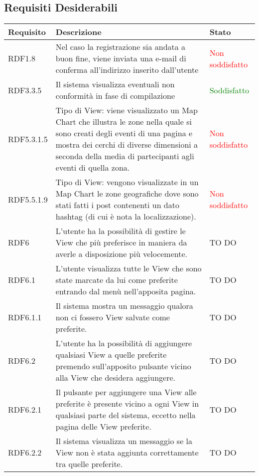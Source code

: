 \subsection{Requisiti Desiderabili}
\begin{center}

	\def\arraystretch{1.5}
	\bgroup
	\begin{longtable}{| p{2.5cm} | p{8cm} | p{3.5cm} |}
		\hline
		\textbf{Requisito} & \textbf{Descrizione} & \textbf{Stato} \\
		\hline
		RDF1.8  &  Nel caso la registrazione sia andata a buon fine, viene inviata una e-mail di conferma all'indirizzo inserito dall'utente  &  \textcolor{red}{ Non soddisfatto} \\
		\hline
		RDF3.3.5  &  Il sistema visualizza eventuali non conformità in fase di compilazione  &  \textcolor{green}{Soddisfatto} \\
		\hline
		RDF5.3.1.5  &  Tipo di View: viene visualizzato un Map Chart che illustra le zone nella quale si sono creati degli eventi di una pagina e mostra dei cerchi di diverse dimensioni a seconda della media di partecipanti agli eventi di quella zona. & \textcolor{red}{ Non soddisfatto} \\
		\hline
		RDF5.5.1.9  &  Tipo di View: vengono visualizzate in un Map Chart le zone geografiche dove sono stati fatti i post contenenti un dato hashtag (di cui è nota la localizzazione). & \textcolor{red}{ Non soddisfatto} \\
		\hline
		RDF6  & L'utente ha la possibilità di gestire le View che più preferisce in maniera da averle a disposizione più velocemente. &  TO DO \\
		\hline
		RDF6.1  & L'utente visualizza tutte le View che sono state marcate da lui come preferite entrando dal menù nell'apposita pagina. & TO DO \\
		\hline
		RDF6.1.1  & Il sistema mostra un messaggio qualora non ci fossero View salvate come preferite. &  TO DO \\
		\hline
		RDF6.2  & L'utente ha la possibilità di aggiungere qualsiasi View a quelle preferite premendo sull'apposito pulsante vicino alla View che desidera aggiungere. & TO DO \\
		\hline
		RDF6.2.1  & Il pulsante per aggiungere una View alle preferite è presente vicino a ogni View in qualsiasi parte del sistema, eccetto nella pagina delle View preferite.  & TO DO \\
		\hline
		RDF6.2.2  & Il sistema visualizza un messaggio se la View non è stata aggiunta correttamente tra quelle preferite.  & TO DO \\

\end{longtable}
\end{center}
